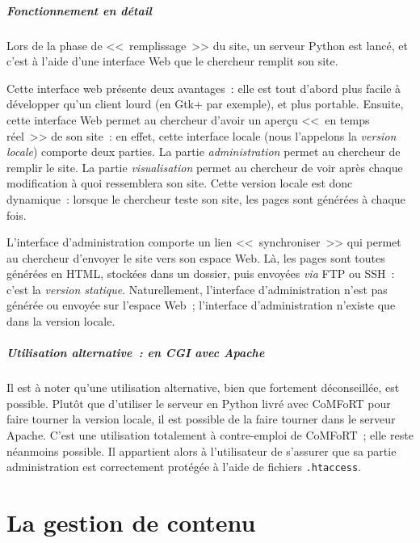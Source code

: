 \documentclass[final,11pt,a4paper,twoside,titlepage]{article}
\newcommand{\p}{\vspace{0.3em}}
\newcommand{\code}[1]{\texttt{#1}}
\begin{document}
{      \subsubsection{Fonctionnement en détail}
        Lors de la phase de <<~remplissage~>> du site, un serveur Python est
        lancé, et c'est à l'aide d'une interface Web que le chercheur remplit son
        site. \p
        
        Cette interface web présente deux avantages~: elle est tout d'abord
        plus facile à développer qu'un client lourd (en Gtk+ par exemple), et plus
        portable. Ensuite, cette interface Web permet au chercheur d'avoir un
        aperçu <<~en temps réel~>> de son site~: en effet, cette interface locale
        (nous l'appelons la \emph{version locale}) comporte deux parties. La
        partie \emph{administration} permet au chercheur de remplir le site. La
        partie \emph{visualisation} permet au chercheur de voir après chaque
        modification à quoi ressemblera son site. Cette version locale est donc
        dynamique~: lorsque le chercheur teste son site, les pages sont générées à
        chaque fois.\p

        L'interface d'administration comporte un lien <<~synchroniser~>> qui
        permet au chercheur d'envoyer le site vers son espace Web. Là, les pages
        sont toutes générées en HTML, stockées dans un dossier, puis envoyées
        \emph{via} FTP ou SSH~: c'est la \emph{version statique}. Naturellement,
        l'interface d'administration n'est pas générée ou envoyée sur l'espace
        Web~; l'interface d'administration n'existe que dans la version locale.

      \subsubsection{Utilisation alternative~: en CGI avec Apache}
        Il est à noter qu'une utilisation alternative, bien que fortement
        déconseillée, est possible. Plutôt que d'utiliser le serveur en Python livré
        avec CoMFoRT pour faire tourner la version locale, il est possible de la
        faire tourner dans le serveur Apache. C'est une utilisation totalement à
        contre-emploi de CoMFoRT~; elle reste néanmoins possible. Il appartient
        alors à l'utilisateur de s'assurer que sa partie administration est
        correctement protégée à l'aide de fichiers \code{.htaccess}.


\part{La gestion de contenu}
}
\end{document}
